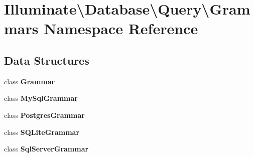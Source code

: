 \section{Illuminate\textbackslash{}Database\textbackslash{}Query\textbackslash{}Grammars Namespace Reference}
\label{namespace_illuminate_1_1_database_1_1_query_1_1_grammars}
\subsection*{Data Structures}
\begin{DoxyCompactItemize}
\item 
class {\bf Grammar}
\item 
class {\bf My\+Sql\+Grammar}
\item 
class {\bf Postgres\+Grammar}
\item 
class {\bf S\+Q\+Lite\+Grammar}
\item 
class {\bf Sql\+Server\+Grammar}
\end{DoxyCompactItemize}
